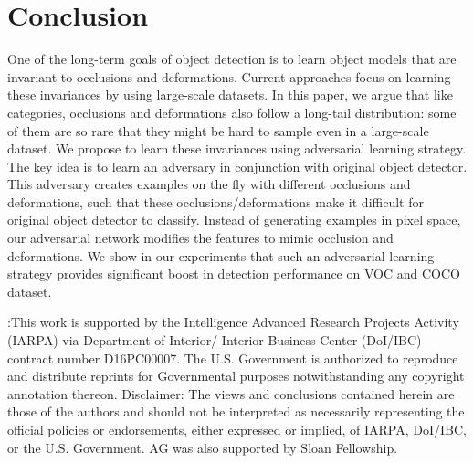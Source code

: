 \documentclass[10pt,twocolumn,letterpaper]{article}
\begin{document}




\vspace{-0.05in}
\section{Conclusion}
\vspace{-0.05in}


One of the long-term goals of object detection is to learn object models that are invariant to occlusions and deformations. Current approaches focus on learning these invariances by using large-scale datasets. In this paper, we argue that like categories, occlusions and deformations also follow a long-tail distribution: some of them are so rare that they might be hard to sample even in a large-scale dataset. We propose to learn these invariances using adversarial learning strategy. The key idea is to learn an adversary in conjunction with original object detector. This adversary creates examples on the fly with different occlusions and deformations, such that these occlusions/deformations make it difficult for original object detector to classify. Instead of generating examples in pixel space, our adversarial network modifies the features to mimic occlusion and deformations. We show in our experiments that such an adversarial learning strategy provides significant boost in detection performance on VOC and COCO dataset.


{\footnotesize
{}:This work is supported by the Intelligence Advanced Research Projects Activity (IARPA) via Department of Interior/ Interior Business Center (DoI/IBC) contract number D16PC00007. The U.S. Government is authorized to reproduce and distribute reprints for Governmental purposes notwithstanding any copyright annotation thereon. Disclaimer: The views and conclusions contained herein are those of the authors and should not be interpreted as necessarily representing the official policies or endorsements, either expressed or implied, of IARPA, DoI/IBC, or the U.S. Government. AG was also supported by Sloan Fellowship.}



{\small


}
\end{document}
